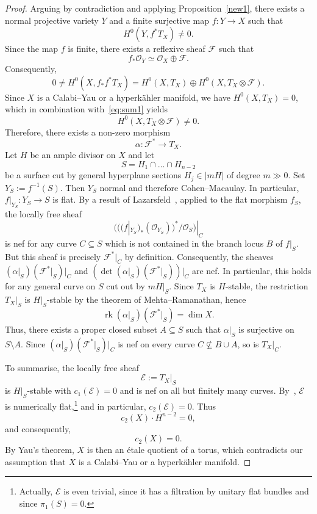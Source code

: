 \documentclass[11pt]{article}
\theoremstyle{definition}
\numberwithin{equation}{section}
\numberwithin{figure}{section}
\numberwithin{table}{section}
\DeclareMathOperator{\rk}{rk}
\newcommand\sE{\mathcal{E}}
\newcommand\sF{\mathcal{F}}
\newcommand\sO{\mathcal{O}}
\newcommand{\OO}{\mathcal{O}}
\begin{document}
\begin{proof}
Arguing by contradiction and applying Proposition~\ref{new1}, there exists a normal projective variety $Y$ and a finite surjective map $f\colon Y \to X$ such that
\[
H^0(Y, f^*T_X) \neq 0.
\]
Since the map $f$ is finite, there exists a reflexive sheaf $\sF$ such that
\[
f_*\sO_{Y} \simeq \sO_X \oplus \sF.
\]
Consequently,
\begin{equation}\label{eq:sum1}
0\neq H^0(X,f_*f^*T_X) = H^0(X, T_X)\oplus H^0(X,T_X \otimes \sF).
\end{equation}
Since $X$ is a Calabi--Yau or a hyperkähler manifold, we have $H^0(X,T_X) = 0$, which in combination with~\eqref{eq:sum1} yields
\[
H^0(X, T_X \otimes \sF) \ne 0.
\]
Therefore, there exists a non-zero morphism
\[
\alpha\colon \sF^* \to T_X.
\]
Let $H$ be an ample divisor on $X$ and let
\[
S = H_1 \cap \ldots \cap H_{n-2}
\]
be a surface cut by general hyperplane sections $H_j \in | mH | $ of degree $m \gg 0$. Set $Y_S := f^{-1}(S)$. Then $Y_S$ normal and therefore Cohen--Macaulay. In particular, $f|_{Y_S}\colon Y_S \to S$ is flat. By a result of Lazarsfeld~\cite[Appendix, Proposition~A]{PS00}, applied to the flat morphism $f_S$, the locally free sheaf
\[
\big(\big((f|_{Y_S})_*(\OO_{Y_S})\big)^*/\OO_S\big)|_C
\]
is nef for any curve $C \subseteq S$ which is not contained in the branch locus $B$ of $f|_S$. But this sheaf is precisely $\sF^*|_C$ by definition. Consequently, the sheaves $(\alpha|_S)(\sF^*|_S){|_C}$ and $(\det (\alpha|_S)(\sF^*|_S)){|_C}$ are nef. In particular, this holds for any general curve on $S$ cut out by $mH|_S$. Since $T_X$ is $H$-stable, the restriction $T_X|_S$ is $H|_S$-stable by the theorem of Mehta--Ramanathan, hence
\[
\rk(\alpha|_S)(\sF^*|_S)=\dim X.
\]
Thus, there exists a proper closed subset $A\subseteq S$ such that $\alpha|_S$ is surjective on $S \setminus A $. Since $(\alpha|_S)(\sF^*|_S){|_C}$ is nef on every curve $C \not \subseteq B \cup A$, so is ${T_X}|_C$.

To summarise, the locally free sheaf
\[
\sE := T_X|_S
\]
is $H|_S$-stable with $c_1(\sE) = 0$ and is nef on all but finitely many curves. By~\cite[Corollary~5.4]{HP17}, $\sE$ is numerically flat,\footnote{Actually, $\sE$ is even trivial, since it has a filtration by unitary flat bundles and since $\pi_1(S) = 0$.} and in particular, $c_2(\sE) = 0$. Thus
\[
c_2(X) \cdot H^{n-2} = 0,
\]
and consequently,
\[
c_2(X) = 0.
\]
By Yau's theorem, $X$ is then an étale quotient of a torus, which contradicts our assumption that $X$ is a Calabi--Yau or a hyperkähler manifold.
\end{proof}
\end{document}
